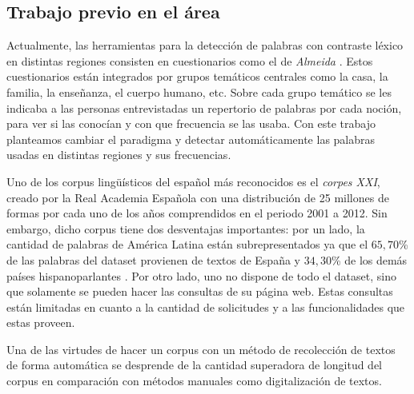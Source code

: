 




\subsection{Trabajo previo en el área}
\par Actualmente, las herramientas para la detección de palabras con contraste léxico en distintas regiones
consisten en cuestionarios como el de \emph{Almeida }\cite{almeida1995variacion}.  Estos cuestionarios están integrados por grupos temáticos centrales como la casa, la familia, la enseñanza, el cuerpo humano, etc. Sobre cada grupo temático se les indicaba a las personas entrevistadas un repertorio de palabras por cada noción, para ver si las conocían y con que frecuencia se las usaba. 
Con este trabajo planteamos cambiar el paradigma y detectar automáticamente las palabras usadas en distintas regiones y sus frecuencias.

Uno de los corpus lingüísticos del español más reconocidos es el \emph{corpes XXI}\cite{espanolabanco}, creado por la Real Academia Española con una distribución de 25 millones de formas por cada uno de los años comprendidos en el periodo 2001 a 2012. Sin
embargo, dicho corpus tiene dos desventajas importantes: por un
lado, la cantidad de palabras de América Latina están subrepresentados ya que el $65,70$\% de las palabras del dataset provienen de textos de España y $34,30$\% de los demás países hispanoparlantes . Por otro lado, uno no dispone de todo el dataset, sino que solamente se pueden hacer las consultas de su página web. Estas consultas están limitadas en cuanto a la cantidad de solicitudes y a las funcionalidades que estas proveen.


Una de las virtudes de hacer un corpus con un método de recolección de textos de forma automática se desprende de la cantidad superadora de longitud del corpus en comparación con métodos manuales como digitalización de textos.

